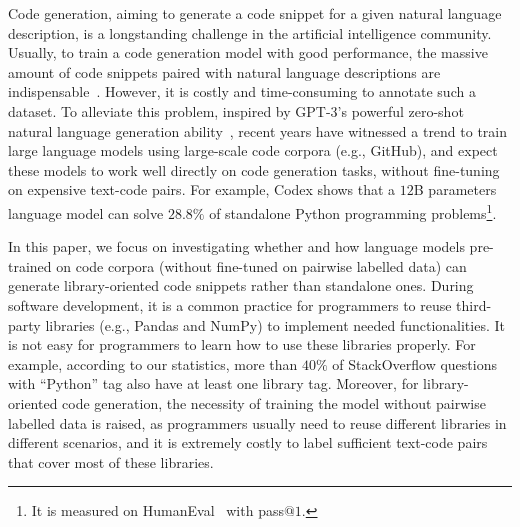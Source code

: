 \documentclass{article}
\newcommand{\pandas}{Pandas\xspace}
\newcommand{\numpy}{NumPy\xspace}
\begin{document}
Code generation, aiming to generate a code snippet for a given natural language description, is a longstanding challenge in the artificial intelligence community. Usually, to train a code generation model with good performance, the massive amount of code snippets paired with natural language descriptions are indispensable~\cite{sun2019grammar,lu2021codexglue}. However, it is costly and time-consuming to annotate such a dataset. To alleviate this problem, inspired by GPT-3's powerful zero-shot natural language generation ability~\cite{brown2020language}, recent years have witnessed a trend to train large language models using large-scale code corpora (e.g., GitHub), and expect these models to work well directly on code generation tasks, without fine-tuning on expensive text-code pairs.
For example, Codex shows that a $12$B parameters language model can solve $28.8\%$ of standalone Python programming problems\footnote{It is measured on HumanEval~\cite{chen2021evaluating} with pass$@1$.}.


In this paper, we focus on investigating whether and how language models pre-trained on code corpora (without fine-tuned on pairwise labelled data) can generate library-oriented code snippets rather than standalone ones.
During software development, it is a common practice for programmers to reuse third-party libraries (e.g., \pandas and \numpy) to implement needed functionalities.
It is not easy for programmers to learn how to use these libraries properly. For example, according to our statistics, more than $40\%$ of StackOverflow questions with ``Python'' tag also have at least one library tag.
Moreover, for library-oriented code generation, the necessity of training the model without pairwise labelled data is raised, as programmers usually need to reuse different libraries in different scenarios, and it is extremely costly to label sufficient text-code pairs that cover most of these libraries.
\end{document}
